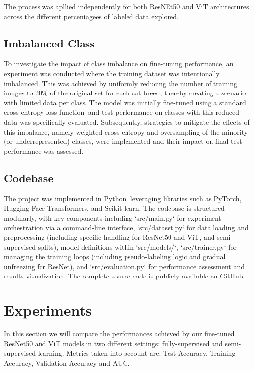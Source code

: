 \documentclass{article}
\begin{document}
The process was apllied independently for both ResNEt50 and ViT architectures across the different percentagees of labeled data explored. 

\subsection{Imbalanced Class}

To investigate the impact of class imbalance on fine-tuning performance, an experiment was conducted where the training dataset was intentionally imbalanced. This was achieved by uniformly reducing the number of training images to 20\% of the original set for each cat breed, thereby creating a scenario with limited data per class. The model was initially fine-tuned using a standard cross-entropy loss function, and test performance on classes with this reduced data was specifically evaluated. Subsequently, strategies to mitigate the effects of this imbalance, namely weighted cross-entropy and oversampling of the minority (or underrepresented) classes, were implemented and their impact on final test performance was assessed.

\subsection{Codebase}
The project was implemented in Python, leveraging libraries such as PyTorch, Hugging Face Transformers, and Scikit-learn. The codebase is structured modularly, with key components including `src/main.py` for experiment orchestration via a command-line interface, `src/dataset.py` for data loading and preprocessing (including specific handling for ResNet50 and ViT, and semi-supervised splits), model definitions within `src/models/`, `src/trainer.py` for managing the training loops (including pseudo-labeling logic and gradual unfreezing for ResNet), and `src/evaluation.py` for performance assessment and results visualization. The complete source code is publicly available on GitHub \cite{OurProject}.

\section{Experiments}
In this section we will compare the performances achieved by our fine-tuned ResNet50 and ViT models in two different settings: fully-supervised and semi-supervised learning. Metrics taken into account are: Test Accuracy, Training Accuracy, Validation Accuracy and AUC.
\end{document}
